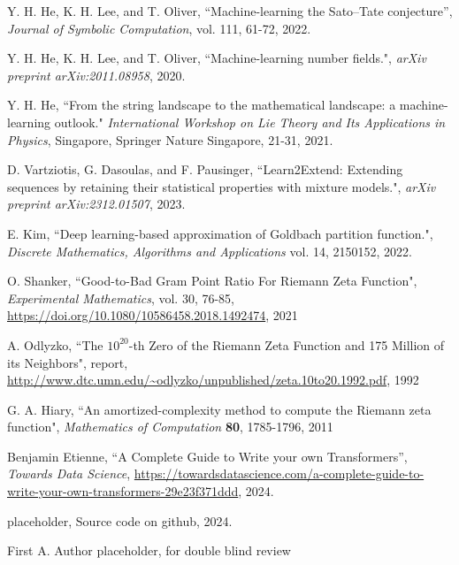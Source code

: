 \documentclass[journal]{IEEEtai}
\begin{document}
\begin{thebibliography}{34}
 Y. H. He, K. H. Lee, and T. Oliver, ``Machine-learning the Sato–Tate conjecture'', \emph{Journal of Symbolic Computation}, vol. 111, 61-72, 2022.

Y. H. He, K. H. Lee, and T. Oliver, 
``Machine-learning number fields.",
\emph{arXiv preprint arXiv:2011.08958}, 2020.

Y. H. He,
``From the string landscape to the mathematical landscape: a machine-learning outlook."
\emph{International Workshop on Lie Theory and Its Applications in Physics}, Singapore, Springer Nature Singapore, 21-31, 2021.

D. Vartziotis, G. Dasoulas,  and  F. Pausinger,
``Learn2Extend: Extending sequences by retaining their statistical properties with mixture models.",
\emph{arXiv preprint arXiv:2312.01507}, 2023.

E. Kim, 
``Deep learning-based approximation of Goldbach partition function.",
\emph{Discrete Mathematics, Algorithms and Applications} vol. 14,  2150152, 2022.

 O. Shanker, 
``Good-to-Bad Gram Point Ratio For Riemann Zeta Function",
\emph{Experimental Mathematics}, vol. 30, 76-85, 
\url{https://doi.org/10.1080/10586458.2018.1492474}, 2021

  A. Odlyzko,
``The $10^{20}$-th Zero of the Riemann Zeta
Function and 175 Million of its Neighbors", report,
\url{http://www.dtc.umn.edu/~odlyzko/unpublished/zeta.10to20.1992.pdf}, 1992

 G. A. Hiary,
``An amortized-complexity method to compute the Riemann zeta function", 
{\it Mathematics of Computation} {\bf80}, 1785-1796, 2011


 Benjamin Etienne, 
``A Complete Guide to Write your own Transformers'',
 \emph{Towards Data Science},
\url{https://towardsdatascience.com/a-complete-guide-to-write-your-own-transformers-29e23f371ddd}, 
2024. 

 placeholder, 
Source code on github,
2024. 


\end{thebibliography}






\begin{IEEEbiography}{First A. Author}{\space}   placeholder, for double blind review
\end{IEEEbiography}
\end{document}
